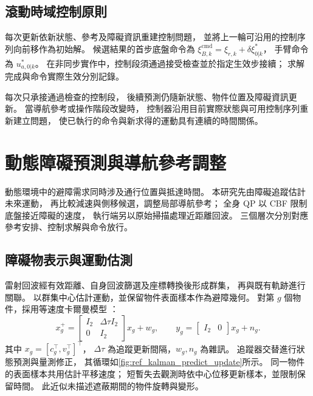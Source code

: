 \subsection{滾動時域控制原則}
\label{subsec:wholebody_receding_horizon}

每次更新依新狀態、參考及障礙資訊重建控制問題，
並將上一輪可沿用的控制序列向前移作為初始解。
候選結果的首步底盤命令為
$\xi_{B,k}^{\mathrm{cmd}}=\xi_{r,k}+\delta\xi_{0|k}^{*}$，
手臂命令為 $u_{a,0|k}^{*}$。
在非同步實作中，控制段須通過接受檢查並於指定生效步接續；
求解完成與命令實際生效分別記錄。

每次只承接通過檢查的控制段，
後續預測仍隨新狀態、物件位置及障礙資訊更新。
當導航參考或操作階段改變時，
控制器沿用目前實際狀態與可用控制序列重新建立問題，
使已執行的命令與新求得的運動具有連續的時間關係。

\section{動態障礙預測與導航參考調整}
\label{sec:dynamic_obstacle_avoidance}

動態環境中的避障需求同時涉及通行位置與抵達時間。
本研究先由障礙追蹤估計未來運動，
再比較減速與側移候選，調整局部導航參考；
全身 QP 以 CBF 限制底盤接近障礙的速度，
執行端另以原始掃描處理近距離回波。
三個層次分別對應參考安排、控制求解與命令放行。

\subsection{障礙物表示與運動估測}
\label{subsec:obstacle_representation_prediction}

雷射回波經有效距離、自身回波篩選及座標轉換後形成群集，
再與既有軌跡進行關聯。
以群集中心估計運動，並保留物件表面樣本作為避障幾何。
對第 $g$ 個物件，採用等速度卡爾曼模型
\cite{kalman1960filter}：
\begin{equation}
    x_g^+=
    \begin{bmatrix}I_2&\Delta\tau I_2\\0&I_2\end{bmatrix}x_g+w_g,
    \qquad
    y_g=\begin{bmatrix}I_2&0\end{bmatrix}x_g+n_g .
    \label{eq:ch3_obstacle_tracking_model}
\end{equation}
其中 $x_g=[c_g^\top,v_g^\top]^\top$，
$\Delta\tau$ 為追蹤更新間隔，$w_g,n_g$ 為雜訊。
追蹤器交替進行狀態預測與量測修正\cite{welch2004kalman}，
其循環如\cref{fig:ref_kalman_predict_update}所示。
同一物件的表面樣本共用估計平移速度；
短暫失去觀測時依中心位移更新樣本，並限制保留時間。
此近似未描述遮蔽期間的物件旋轉與變形。


